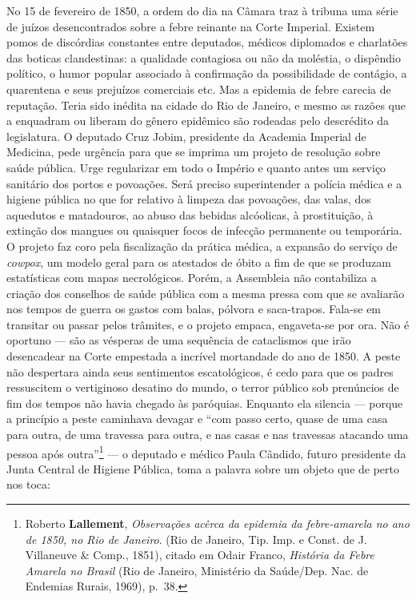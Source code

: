 No 15 de fevereiro de 1850, a ordem do dia na Câmara traz à tribuna uma
série de juízos desencontrados sobre a febre reinante na Corte Imperial.
Existem pomos de discórdias constantes entre deputados, médicos
diplomados e charlatões das boticas clandestinas: a qualidade contagiosa
ou não da moléstia, o dispêndio político, o humor popular associado à
confirmação da possibilidade de contágio, a quarentena e seus prejuízos
comerciais etc. Mas a epidemia de febre carecia de reputação. Teria sido
inédita na cidade do Rio de Janeiro, e mesmo as razões que a enquadram
ou liberam do gênero epidêmico são rodeadas pelo descrédito da
legislatura. O deputado Cruz Jobim, presidente da Academia Imperial de
Medicina, pede urgência para que se imprima um projeto de resolução
sobre saúde pública. Urge regularizar em todo o Império e quanto antes
um serviço sanitário dos portos e povoações. Será preciso superintender
a polícia médica e a higiene pública no que for relativo à limpeza das
povoações, das valas, dos aquedutos e matadouros, ao abuso das bebidas
alcóolicas, à prostituição, à extinção dos mangues ou quaisquer focos de
infecção permanente ou temporária. O projeto faz coro pela fiscalização
da prática médica, a expansão do serviço de \textit{cowpox}, um modelo
geral para os atestados de óbito a fim de que se produzam estatísticas
com mapas necrológicos. Porém, a Assembleia não contabiliza a criação
dos conselhos de saúde pública com a mesma pressa com que se avaliarão
nos tempos de guerra os gastos com balas, pólvora e saca-trapos. Fala-se
em transitar ou passar pelos trâmites, e o projeto empaca, engaveta-se
por ora. Não é oportuno --- são as vésperas de uma sequência de
cataclismos que irão desencadear na Corte empestada a incrível
mortandade do ano de 1850. A peste não despertara ainda seus sentimentos
escatológicos, é cedo para que os padres ressuscitem o vertiginoso
desatino do mundo, o terror público sob prenúncios de fim dos tempos não
havia chegado às paróquias. Enquanto ela silencia --- porque a princípio
a peste caminhava devagar e ``com passo certo, quase de uma casa para
outra, de uma travessa para outra, e nas casas e nas travessas atacando
uma pessoa após outra''\footnote{Roberto \textbf{Lallement},
  \textit{Observações acêrca da epidemia da febre-amarela no ano de 1850,
  no Rio de Janeiro}. (Rio de Janeiro, Tip. Imp. e Const. de J.
  Villaneuve \& Comp., 1851), citado em Odair Franco, \textit{História da
  Febre Amarela no Brasil} (Rio de Janeiro, Ministério da Saúde/Dep.
  Nac. de Endemias Rurais, 1969), p.~38.} --- o deputado e médico Paula
Cândido, futuro presidente da Junta Central de Higiene Pública, toma a
palavra sobre um objeto que de perto nos toca:

